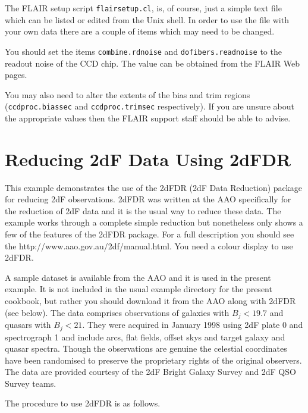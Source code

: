 \documentclass[chapters,twoside,11pt]{starlink}
\begin{document}
The FLAIR setup script \texttt{flairsetup.cl}, is, of course, just
a simple text file which can be listed or edited from the Unix
shell.  In order to use the file with your own data there are
a couple of items which may need to be changed.

You should set the items \texttt{combine.rdnoise} and \texttt{dofibers.readnoise} to the readout noise of the CCD chip.  The value
can be obtained from the FLAIR Web pages.

You may also need to alter the extents of the bias and trim
regions (\texttt{ccdproc.biassec} and \texttt{ccdproc.trimsec}
respectively).  If you are unsure about the appropriate values
then the FLAIR support staff should be able to advise.


\newpage
\section{\label{2DF}Reducing 2dF Data Using 2dFDR}

This example demonstrates the use of the 2dFDR (2dF Data Reduction)
package for reducing 2dF observations.  2dFDR was written at the AAO
specifically for the reduction of 2dF data and it is the usual way to
reduce these data.  The example works through a complete simple
reduction but nonetheless only shows a few of the features of the
2dFDR package.  For a full description you should see the
{http://www.aao.gov.au/2df/manual.html}\cite{BAILEY97}.  You need a
colour display to use 2dFDR.

A sample dataset is available from the AAO and it is used in the present
example.  It is not included in the usual example directory for the
present cookbook, but rather you should download it from the AAO along
with 2dFDR (see below).  The data comprises observations of galaxies
with $B_{j} < 19.7$ and quasars with $B_{j} < 21$.  They were acquired
in January 1998 using 2dF plate 0 and spectrograph 1 and include arcs,
flat fields, offset skys and target galaxy and quasar spectra.  Though
the observations are genuine the celestial coordinates have been
randomised to preserve the proprietary rights of the original observers.
The data are provided courtesy of the 2dF Bright Galaxy Survey and
2dF QSO Survey teams.

The procedure to use 2dFDR is as follows.
\end{document}
